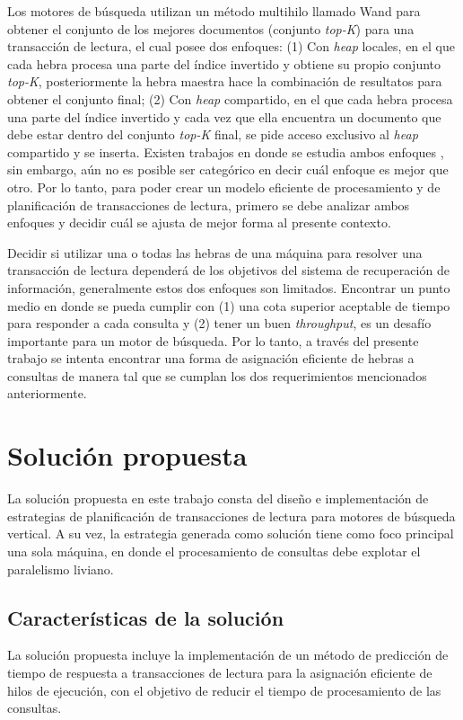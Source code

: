 Los motores de búsqueda utilizan un método multihilo llamado Wand para obtener el conjunto de los mejores documentos (conjunto \textit{top-K}) para una transacción de lectura, el cual posee dos enfoques: (1) Con \textit{heap} locales, en el que cada hebra procesa una parte del índice invertido y obtiene su propio conjunto \textit{top-K}, posteriormente la hebra maestra hace la combinación de resultatos para obtener el conjunto final; (2) Con \textit{heap} compartido, en el que cada hebra procesa una parte del índice invertido y cada vez que ella encuentra un documento que debe estar dentro del conjunto \textit{top-K} final, se pide acceso exclusivo al \textit{heap} compartido y se inserta. Existen trabajos en donde se estudia ambos enfoques \citep{Rojas:2013}, sin embargo, aún no es posible ser categórico en decir cuál enfoque es mejor que otro. Por lo tanto, para poder crear un modelo eficiente de procesamiento y de planificación de transacciones de lectura, primero se debe analizar ambos enfoques y decidir cuál se ajusta de mejor forma al presente contexto.

Decidir si utilizar una o todas las hebras de una máquina para resolver una transacción de lectura dependerá de los objetivos del sistema de recuperación de información, generalmente estos dos enfoques son limitados. Encontrar un punto medio en donde se pueda cumplir con (1) una cota superior aceptable de tiempo para responder a cada consulta y (2) tener un buen \textit{throughput}, es un desafío importante para un motor de búsqueda. Por lo tanto, a través del presente trabajo se intenta encontrar una forma de asignación eficiente de hebras a consultas de manera tal que se cumplan los dos requerimientos mencionados anteriormente. 


\section{Solución propuesta}
\label{intro:solucionpropuesta}
La solución propuesta en este trabajo consta del diseño e implementación de estrategias de planificación de transacciones de lectura para motores de búsqueda vertical. A su vez, la estrategia generada como solución tiene como foco principal una sola máquina, en donde el procesamiento de consultas debe explotar el paralelismo liviano. 


\subsection{Caracter\'isticas de la solución}
\label{intro:caracteristicassolucion}
La solución propuesta incluye la implementación de un método de predicción de tiempo de respuesta a transacciones de lectura para la asignación eficiente de hilos de ejecución, con el objetivo de reducir el tiempo de procesamiento de las consultas. 

